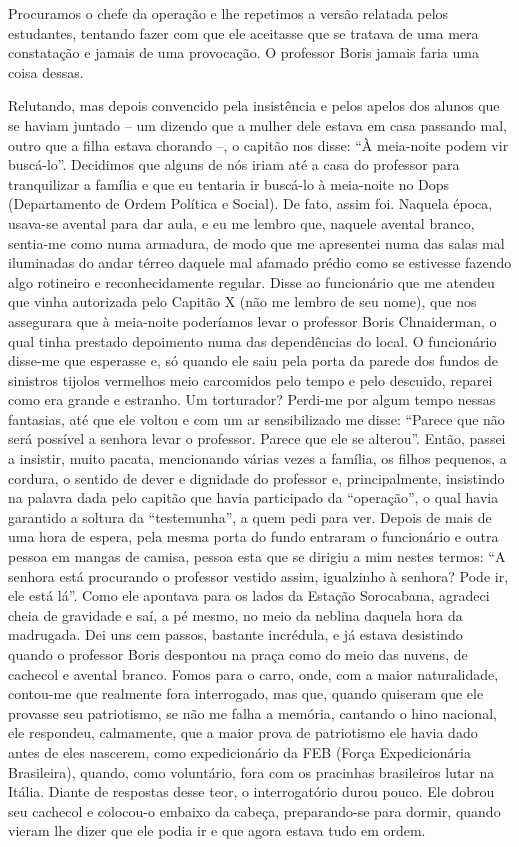 Procuramos o chefe da operação e lhe repetimos a versão relatada pelos
estudantes, tentando fazer com que ele aceitasse que se tratava de uma
mera constatação e jamais de uma provocação. O professor Boris jamais
faria uma coisa dessas.

Relutando, mas depois convencido pela insistência e pelos apelos dos
alunos que se haviam juntado -- um dizendo que a mulher dele estava em
casa passando mal, outro que a filha estava chorando --, o capitão nos
disse: ``À meia-noite podem vir buscá-lo''. Decidimos que alguns de nós
iriam até a casa do professor para tranquilizar a família e que eu
tentaria ir buscá-lo à meia-noite no Dops (Departamento de Ordem
Política e Social). De fato, assim foi. Naquela época, usava-se avental
para dar aula, e eu me lembro que, naquele avental branco, sentia-me
como numa armadura, de modo que me apresentei numa das salas mal
iluminadas do andar térreo daquele mal afamado prédio como se estivesse
fazendo algo rotineiro e reconhecidamente regular. Disse ao funcionário
que me atendeu que vinha autorizada pelo Capitão X (não me lembro de seu
nome), que nos assegurara que à meia-noite poderíamos levar o professor
Boris Chnaiderman, o qual tinha prestado depoimento numa das
dependências do local. O funcionário disse-me que esperasse e, só quando
ele saiu pela porta da parede dos fundos de sinistros tijolos vermelhos
meio carcomidos pelo tempo e pelo descuido, reparei como era grande e
estranho. Um torturador? Perdi-me por algum tempo nessas fantasias, até
que ele voltou e com um ar sensibilizado me disse: ``Parece que não será
possível a senhora levar o professor. Parece que ele se alterou''.
Então, passei a insistir, muito pacata, mencionando várias vezes a
família, os filhos pequenos, a cordura, o sentido de dever e dignidade
do professor e, principalmente, insistindo na palavra dada pelo capitão
que havia participado da ``operação'', o qual havia garantido a soltura
da ``testemunha'', a quem pedi para ver. Depois de mais de uma hora de
espera, pela mesma porta do fundo entraram o funcionário e outra pessoa
em mangas de camisa, pessoa esta que se dirigiu a mim nestes termos: ``A
senhora está procurando o professor vestido assim, igualzinho à senhora?
Pode ir, ele está lá''. Como ele apontava para os lados da Estação
Sorocabana, agradeci cheia de gravidade e saí, a pé mesmo, no meio da
neblina daquela hora da madrugada. Dei uns cem passos, bastante
incrédula, e já estava desistindo quando o professor Boris despontou na
praça como do meio das nuvens, de cachecol e avental branco. Fomos para
o carro, onde, com a maior naturalidade, contou-me que realmente fora
interrogado, mas que, quando quiseram que ele provasse seu patriotismo,
se não me falha a memória, cantando o hino nacional, ele respondeu,
calmamente, que a maior prova de patriotismo ele havia dado antes de
eles nascerem, como expedicionário da FEB (Força Expedicionária
Brasileira), quando, como voluntário, fora com os pracinhas brasileiros
lutar na Itália. Diante de respostas desse teor, o interrogatório durou
pouco. Ele dobrou seu cachecol e colocou-o embaixo da cabeça,
preparando-se para dormir, quando vieram lhe dizer que ele podia ir e
que agora estava tudo em ordem.

